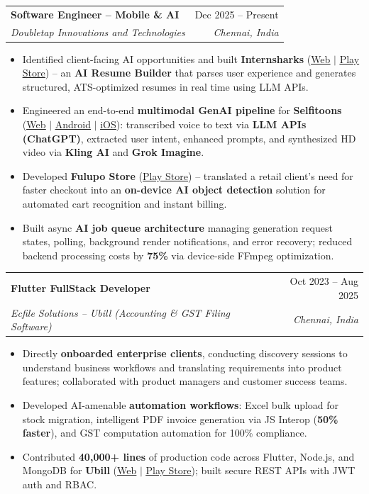 \documentclass[letterpaper,10pt]{article}
\makeatletter
\newcommand{\resumeItem}[1]{\item\small{{#1 \vspace{-2pt}}}}
\newcommand{\resumeSubheading}[4]{
  \vspace{-2pt}\item
    \begin{tabular*}{0.97\textwidth}[t]{l@{\extracolsep{\fill}}r}
      \textbf{#1} & #2 \\
      \textit{\small#3} & \textit{\small #4} \\
    \end{tabular*}\vspace{-7pt}
}
\newcommand{\resumeItemListStart}{\begin{itemize}}
\newcommand{\resumeItemListEnd}{\end{itemize}\vspace{-5pt}}
\makeatother
\begin{document}
    \resumeSubheading
      {Software Engineer -- Mobile \& AI}{Dec 2025 -- Present}
      {Doubletap Innovations and Technologies}{Chennai, India}
      \resumeItemListStart
        \resumeItem{Identified client-facing AI opportunities and built \textbf{Internsharks} (\href{https://internsharks.ai/}{\underline{Web}} $|$ \href{https://play.google.com/store/apps/details?id=com.doubletap.internsharks.ai}{\underline{Play Store}}) -- an \textbf{AI Resume Builder} that parses user experience and generates structured, ATS-optimized resumes in real time using LLM APIs.}
        \resumeItem{Engineered an end-to-end \textbf{multimodal GenAI pipeline} for \textbf{Selfitoons} (\href{https://selfitoons.ai/}{\underline{Web}} $|$ \href{https://play.google.com/store/apps/details?id=com.doubletap.ai.selfitoons}{\underline{Android}} $|$ \href{https://apps.apple.com/in/app/selfitoons/id6758597947}{\underline{iOS}}): transcribed voice to text via \textbf{LLM APIs (ChatGPT)}, extracted user intent, enhanced prompts, and synthesized HD video via \textbf{Kling AI} and \textbf{Grok Imagine}.}
        \resumeItem{Developed \textbf{Fulupo Store} (\href{https://play.google.com/store/apps/details?id=com.doubletap.fulupostore}{\underline{Play Store}}) -- translated a retail client's need for faster checkout into an \textbf{on-device AI object detection} solution for automated cart recognition and instant billing.}
        \resumeItem{Built async \textbf{AI job queue architecture} managing generation request states, polling, background render notifications, and error recovery; reduced backend processing costs by \textbf{75\%} via device-side FFmpeg optimization.}
      \resumeItemListEnd

    \resumeSubheading
      {Flutter FullStack Developer}{Oct 2023 -- Aug 2025}
      {Ecfile Solutions -- Ubill (Accounting \& GST Filing Software)}{Chennai, India}
      \resumeItemListStart
        \resumeItem{Directly \textbf{onboarded enterprise clients}, conducting discovery sessions to understand business workflows and translating requirements into product features; collaborated with product managers and customer success teams.}
        \resumeItem{Developed AI-amenable \textbf{automation workflows}: Excel bulk upload for stock migration, intelligent PDF invoice generation via JS Interop (\textbf{50\% faster}), and GST computation automation for 100\% compliance.}
        \resumeItem{Contributed \textbf{40,000+ lines} of production code across Flutter, Node.js, and MongoDB for \textbf{Ubill} (\href{https://app.ubill.tech/}{\underline{Web}} $|$ \href{https://play.google.com/store/apps/details?id=com.ubill.tech}{\underline{Play Store}}); built secure REST APIs with JWT auth and RBAC.}
      \resumeItemListEnd
\end{document}
